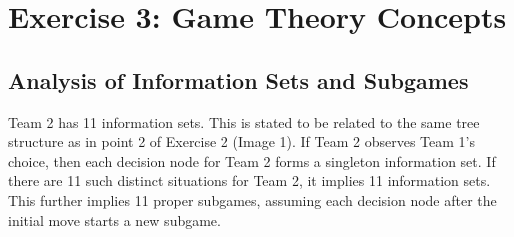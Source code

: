 \section*{Exercise 3: Game Theory Concepts}
\begin{solution}
\subsection*{Analysis of Information Sets and Subgames}
Team 2 has 11 information sets. This is stated to be related to the same tree structure as in point 2 of Exercise 2 (Image 1). If Team 2 observes Team 1's choice, then each decision node for Team 2 forms a singleton information set. If there are 11 such distinct situations for Team 2, it implies 11 information sets. This further implies 11 proper subgames, assuming each decision node after the initial move starts a new subgame.


\end{solution}
